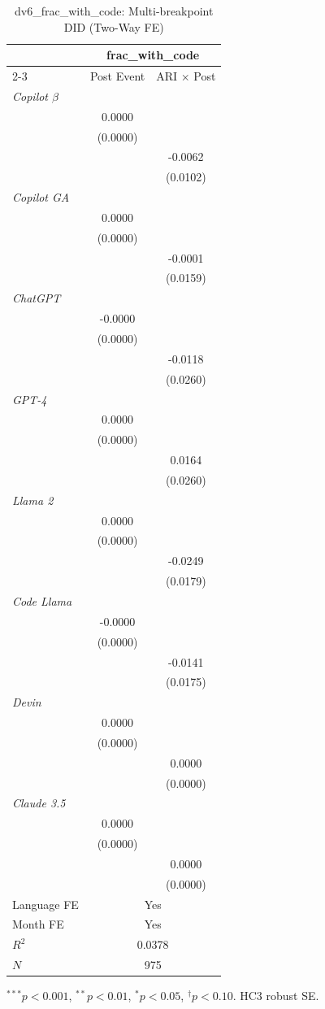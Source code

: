 \begin{table}[htbp]\centering
\caption{dv6_frac_with_code: Multi-breakpoint DID (Two-Way FE)}
\begin{tabular}{lcc}
\toprule
 & \multicolumn{2}{c}{frac_with_code} \\
\cmidrule(l){2-3}
 & Post Event & ARI $\times$ Post \\
\midrule
\textit{Copilot $\beta$} & & \\
 & 0.0000 & \\
 & (0.0000) & \\
 &  & -0.0062 \\
 &  & (0.0102) \\
\textit{Copilot GA} & & \\
 & 0.0000 & \\
 & (0.0000) & \\
 &  & -0.0001 \\
 &  & (0.0159) \\
\textit{ChatGPT} & & \\
 & -0.0000 & \\
 & (0.0000) & \\
 &  & -0.0118 \\
 &  & (0.0260) \\
\textit{GPT-4} & & \\
 & 0.0000 & \\
 & (0.0000) & \\
 &  & 0.0164 \\
 &  & (0.0260) \\
\textit{Llama 2} & & \\
 & 0.0000 & \\
 & (0.0000) & \\
 &  & -0.0249 \\
 &  & (0.0179) \\
\textit{Code Llama} & & \\
 & -0.0000 & \\
 & (0.0000) & \\
 &  & -0.0141 \\
 &  & (0.0175) \\
\textit{Devin} & & \\
 & 0.0000 & \\
 & (0.0000) & \\
 &  & 0.0000 \\
 &  & (0.0000) \\
\textit{Claude 3.5} & & \\
 & 0.0000 & \\
 & (0.0000) & \\
 &  & 0.0000 \\
 &  & (0.0000) \\
\midrule
Language FE & \multicolumn{2}{c}{Yes} \\
Month FE    & \multicolumn{2}{c}{Yes} \\
$R^2$ & \multicolumn{2}{c}{0.0378} \\
$N$   & \multicolumn{2}{c}{975} \\
\bottomrule
\end{tabular}
{\footnotesize $^{***}p<0.001$, $^{**}p<0.01$, $^{*}p<0.05$, $^{\dagger}p<0.10$. HC3 robust SE.}
\end{table}